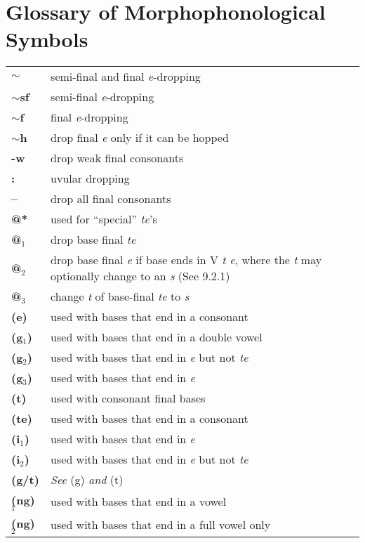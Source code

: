 \documentclass{article}
\begin{document}
\section{Glossary of Morphophonological Symbols}

\begin{tabular}{l l}

\textbf{$\sim$} & semi-final and final \textit{e}-dropping \\
\textbf{$\sim$sf} & semi-final \textit{e}-dropping \\
\textbf{$\sim$f} & final \textit{e}-dropping \\
\textbf{$\sim$h} & drop final \textit{e} only if it can be hopped \\
\textbf{-w} & drop weak final consonants \\
\textbf{:} & uvular dropping \\
\textbf{--} & drop all final consonants \\
\textbf{@*} & used for ``special'' \textit{te}'s \\
\textbf{@$_\text{1}$} & drop base final \textit{te} \\
\textbf{@$_\text{2}$} & drop base final \textit{e} if base ends in V \textit{t e}, where the \textit{t} may optionally change to an \textit{s} (See 9.2.1) \\
\textbf{@$_\text{3}$} & change \textit{t} of base-final \textit{te} to \textit{s} \\ 
\textbf{(e)} & used with bases that end in a consonant \\
\textbf{(g$_\text{1}$)} & used with bases that end in a double vowel \\
\textbf{(g$_\text{2}$)} & used with bases that end in \textit{e} but not \textit{te} \\
\textbf{(g$_\text{3}$)} & used with bases that end in \textit{e} \\
\textbf{(t)} & used with consonant final bases \\
\textbf{(te)} & used with bases that end in a consonant \\
\textbf{(i$_\text{1}$)} & used with bases that end in \textit{e} \\
\textbf{(i$_\text{2}$)} & used with bases that end in \textit{e} but not \textit{te} \\
\textbf{(g/t)} & \textit{See} (g) \textit{and} (t) \\
\textbf{(ng)$_\text{1}$} & used with bases that end in a vowel \\
\textbf{(ng)$_\text{2}$} & used with bases that end in a full vowel only \\

\end{tabular}
\end{document}
